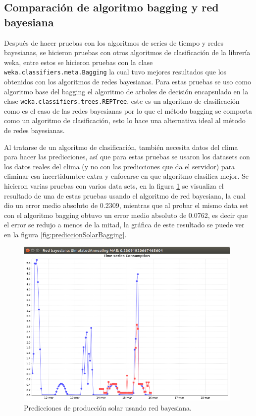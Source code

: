 \subsection{Comparación de algoritmo bagging y red bayesiana} \label{subsec:comparacionBaggingRedB}

Después de hacer pruebas con los algoritmos de series de tiempo y redes bayesianas, se hicieron pruebas con otros algoritmos de clasificación de la librería weka, entre estos se hicieron pruebas con la clase \texttt{weka.classifiers.meta.Bagging} la cual tuvo mejores resultados que los obtenidos con los algoritmos de redes bayesianas. %
Para estas pruebas se uso como algoritmo base del bagging el algoritmo de arboles de decisión encapsulado en la clase \texttt{weka.classifiers.trees.REPTree}, este es un algoritmo de clasificación como es el caso de las redes bayesianas por lo que el método bagging se comporta como un algoritmo de clasificación, esto lo hace una alternativa ideal al método de redes bayesianas.

Al tratarse de un algoritmo de clasificación, también necesita datos del clima para hacer las predicciones, así que para estas pruebas se usaron los datasets con los datos reales del clima (y no con las predicciones que da el servidor) para eliminar esa incertidumbre extra y enfocarse en que algoritmo clasifica mejor. 
Se hicieron varias pruebas con varios data sets, en la figura \ref{fig:prediccionSolarRedBayesiana} se visualiza el resultado de una de estas pruebas usando el algoritmo de red bayesiana, la cual dio un error medio absoluto de 0.2309, mientras que al probar el mismo data set con el algoritmo bagging obtuvo un error medio absoluto de 0.0762, es decir que el error se redujo a menos de la mitad, la gráfica de este resultado se puede ver en la figura \ref{fig:prediccionSolarBagging}.

\begin{figure}[h]
	\centering
	\includegraphics[width=11cm]{img/prediccionSolarRedBayesiana.png}
	\caption{Predicciones de producción solar usando red bayesiana.}
	\label{fig:prediccionSolarRedBayesiana}
\end{figure}

